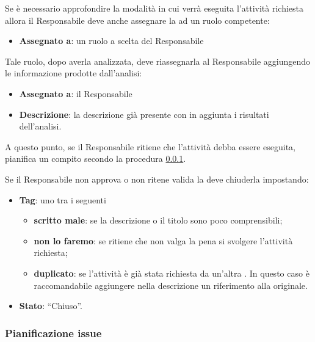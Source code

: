 Se è necessario approfondire la modalità in cui verrà eseguita l'attività richiesta allora il Responsabile deve anche assegnare la  ad un ruolo competente:
\begin{itemize}
 \item \textbf{Assegnato a}: un ruolo a scelta del Responsabile
\end{itemize}

Tale ruolo, dopo averla analizzata, deve riassegnarla al Responsabile aggiungendo le informazione prodotte dall'analisi:
\begin{itemize}
 \item \textbf{Assegnato a}: il Responsabile
 \item \textbf{Descrizione}: la descrizione già presente con in aggiunta i risultati dell'analisi.
\end{itemize}

A questo punto, se il Responsabile ritiene che l'attività debba essere eseguita, pianifica un compito secondo la procedura \ref{pianificazione}.

Se il Responsabile non approva o non ritene valida la  deve chiuderla impostando:
\begin{itemize}
 \item \textbf{Tag}: uno tra i seguenti
  \begin{itemize}
   \item \textbf{scritto male}: se la descrizione o il titolo sono poco comprensibili;
   \item \textbf{non lo faremo}: se ritiene che non valga la pena si svolgere l'attività richiesta;
   \item \textbf{duplicato}: se l'attività è già stata richiesta da un'altra . In questo caso è raccomandabile aggiungere nella descrizione un riferimento alla  originale.
  \end{itemize}
 \item \textbf{Stato}: ``Chiuso''.
\end{itemize}

\subsubsection{Pianificazione issue}
\label{pianificazione}

